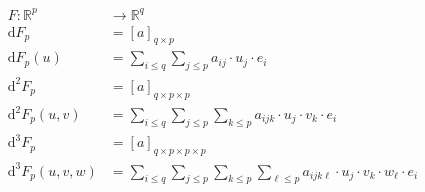 \documentclass[11pt,a4paper]{article}
\begin{document}
		\begin{align*}
    F: \mathbb{R}^p &\rightarrow \mathbb{R}^q \\
    \mathrm{d}F_p &= [a]_{q \times p} \\
    \mathrm{d}F_p(u) &= \sum_{i \le q} \sum_{j \le p} a_{ij} \cdot u_j \cdot e_i \\
    \mathrm{d}^2F_p &= [a]_{q \times p \times p} \\
    \mathrm{d}^2F_p(u,v) &= \sum_{i \le q} \sum_{j \le p} \sum_{k \le p} a_{ijk} \cdot u_j \cdot v_k \cdot e_i \\
    \mathrm{d}^3F_p &= [a]_{q \times p \times p \times p} \\
    \mathrm{d}^3F_p(u,v,w) &= \sum_{i \le q} \sum_{j \le p} \sum_{k \le p} \sum_{\ell \le p} a_{ijk\ell} \cdot u_j \cdot v_k \cdot w_\ell \cdot e_i
		\end{align*}
\end{document}
